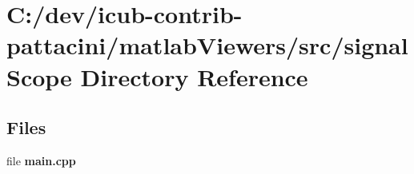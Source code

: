 \section{C\+:/dev/icub-\/contrib-\/pattacini/matlab\+Viewers/src/signal\+Scope Directory Reference}
\label{dir_985ff0338e34c6a4cb84290f3920672f}
\subsection*{Files}
\begin{DoxyCompactItemize}
\item 
file {\bfseries main.\+cpp}
\end{DoxyCompactItemize}
